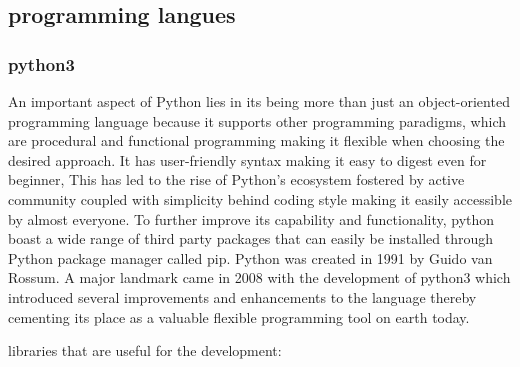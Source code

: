 \subsection{programming langues}
\subsubsection{python3}
An important aspect of Python lies in its being more than just an object-oriented programming language because it supports other programming paradigms, which are procedural and functional programming making it flexible when choosing the desired approach. It has user-friendly syntax making it easy to digest even for beginner, This has led to the rise of Python's ecosystem fostered by active community coupled with simplicity behind coding style making it easily accessible by almost everyone. To further improve its capability and functionality, python boast a wide range of third party packages that can easily be installed through Python package manager called pip. Python was created in 1991 by Guido van Rossum. A major landmark came in 2008 with the development of python3 which introduced several improvements and enhancements to the language thereby cementing its place as a valuable flexible programming tool on earth today. \cite{python}






libraries that are useful for the development:

